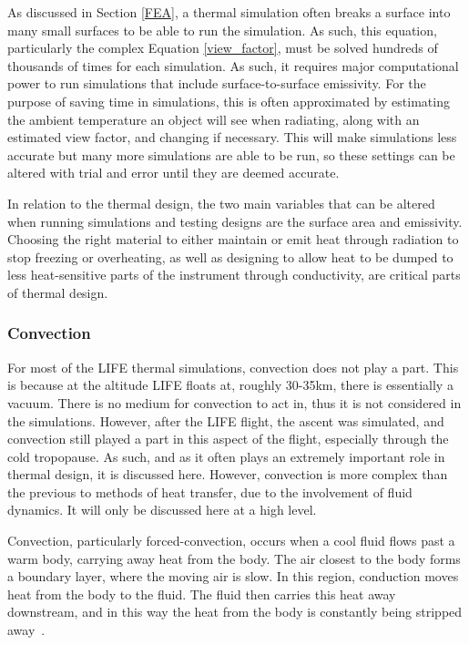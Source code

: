 As discussed in Section \ref{FEA}, a thermal simulation often breaks a surface into many small surfaces to be able to run the simulation. As such, this equation, particularly the complex Equation \ref{view_factor}, must be solved hundreds of thousands of times for each simulation. As such, it requires major computational power to run simulations that include surface-to-surface emissivity. For the purpose of saving time in simulations, this is often approximated by estimating the ambient temperature an object will see when radiating, along with an estimated view factor, and changing if necessary. This will make simulations less accurate but many more simulations are able to be run, so these settings can be altered with trial and error until they are deemed accurate.

 In relation to the thermal design, the two main variables that can be altered when running simulations and testing designs are the surface area and emissivity. Choosing the right material to either maintain or emit heat through radiation to stop freezing or overheating, as well as designing to allow heat to be dumped to less heat-sensitive parts of the instrument through conductivity, are critical parts of thermal design.

\subsubsection{Convection}
For most of the LIFE thermal simulations, convection does not play a part. This is because at the altitude LIFE floats at, roughly 30-35km, there is essentially a vacuum. There is no medium for convection to act in, thus it is not considered in the simulations. However, after the LIFE flight, the ascent was simulated, and convection still played a part in this aspect of the flight, especially through the cold tropopause. As such, and as it often plays an extremely important role in thermal design, it is discussed here. However, convection is more complex than the previous to methods of heat transfer, due to the involvement of fluid dynamics. It will only be discussed here at a high level.

Convection, particularly forced-convection, occurs when a cool fluid flows past a warm body, carrying away heat from the body. The air closest to the body forms a boundary layer, where the moving air is slow. In this region, conduction moves heat from the body to the fluid. The fluid then carries this heat away downstream, and in this way the heat from the body is constantly being stripped away~\citep{heat_transfer_textbook}.

